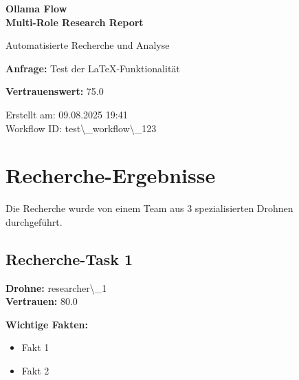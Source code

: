 \documentclass[12pt,a4paper]{article}
\begin{document}
\begin{titlepage}
    \centering
    
    \vspace*{2cm}
    
    {\Huge\bfseries Ollama Flow\\Multi-Role Research Report}
    
    \vspace{1cm}
    
    {\Large\color{darkgray} Automatisierte Recherche und Analyse}
    
    \vspace{2cm}
    
    \begin{infobox}
        \centering
        \textbf{Anfrage:} Test der LaTeX-Funktionalität
    \end{infobox}
    
    \vspace{2cm}
    
    \begin{confidencebox}
        \centering
        \textbf{Vertrauenswert:} 75.0%
    \end{confidencebox}
    
    \vfill
    
    {\large
    Erstellt am: 09.08.2025 19:41\\
    Workflow ID: test\textbackslash{}_workflow\textbackslash{}_123
    }
    
\end{titlepage}

\newpage
\tableofcontents
\newpage

\section{Recherche-Ergebnisse}

Die Recherche wurde von einem Team aus 3 spezialisierten Drohnen durchgeführt.

\subsection{Recherche-Task 1}

\textbf{Drohne:} researcher\textbackslash{}_1\\
\textbf{Vertrauen:} 80.0%

\textbf{Wichtige Fakten:}
\begin{itemize}
\item Fakt 1
\item Fakt 2
\end{itemize}
\end{document}
